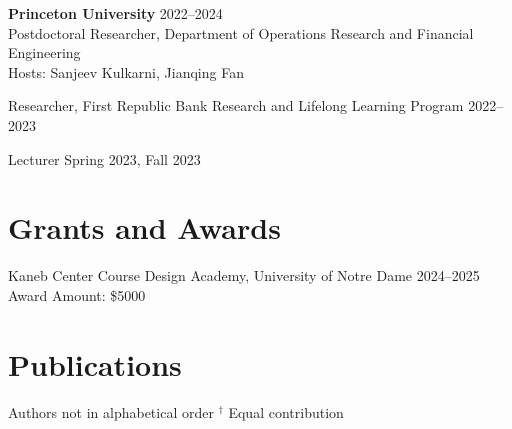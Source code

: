 \documentclass[11pt]{article}
\begin{document}
	\textbf{Princeton University} \hfill 2022--2024 \\
	Postdoctoral Researcher, Department of Operations Research and Financial Engineering \\
	Hosts: Sanjeev Kulkarni, Jianqing Fan
	
	Researcher, First Republic Bank Research and Lifelong Learning Program \hfill 2022--2023
	
	Lecturer \hfill Spring 2023, Fall 2023
	
	\section*{Grants and Awards}
	Kaneb Center Course Design Academy, University of Notre Dame \hfill 2024--2025 \\
	Award Amount: \$5000
	
	\section*{Publications}
	{\small * Authors not in alphabetical order \quad $^\dagger$ Equal contribution}
	
\end{document}
